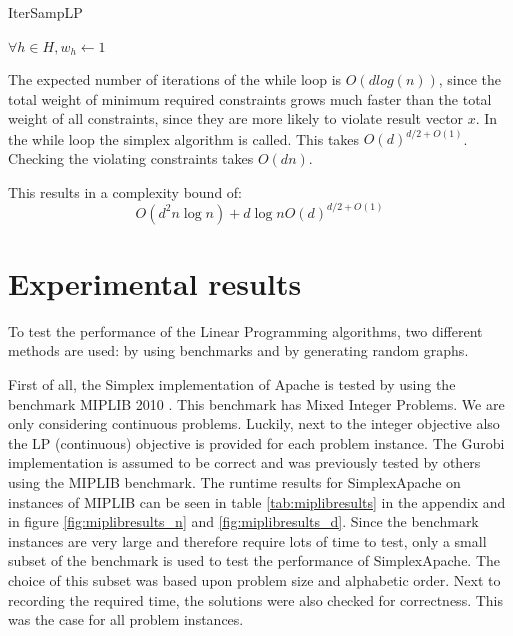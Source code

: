 \documentclass[nocopyrightspace]{acm_proc_article-sp}
\begin{document}
\begin{algorithm}[h]
\label{alg:itersamplp}
\caption{IterSampLP}
$\forall h \in H, w_h \gets 1$ \;
\end{algorithm}

The expected number of iterations of the while loop is $O(d log(n))$, since the total weight of minimum required constraints grows much faster than the total weight of all constraints, since they are more likely to violate result vector $x$. In the while loop the simplex algorithm is called. This takes $O(d)^{d/2+O(1)}$. Checking the violating constraints takes $O(dn)$. 

This results in a complexity bound of:
\begin{equation}
O(d^2n \log{n}) + d \log{n} O(d)^{d/2+O(1)}
\end{equation}
\vfill
\section{Experimental results}
To test the performance of the Linear Programming algorithms, two different methods are used: by using benchmarks and by generating random graphs.

First of all, the Simplex implementation of Apache is tested by using the benchmark MIPLIB 2010 \cite{KochEtAl2011}. This benchmark has Mixed Integer Problems. We are only considering continuous problems. Luckily, next to the integer objective also the LP (continuous) objective is provided for each problem instance. The Gurobi implementation is assumed to be correct and was previously tested by others using the MIPLIB benchmark. The runtime results for SimplexApache on instances of MIPLIB can be seen in table \ref{tab:miplibresults} in the appendix and in figure \ref{fig:miplibresults_n} and \ref{fig:miplibresults_d}. Since the benchmark instances are very large and therefore require lots of time to test, only a small subset of the benchmark is used to test the performance of SimplexApache. The choice of this subset was based upon problem size and alphabetic order. Next to recording the required time, the solutions were also checked for correctness. This was the case for all problem instances. 
\end{document}
